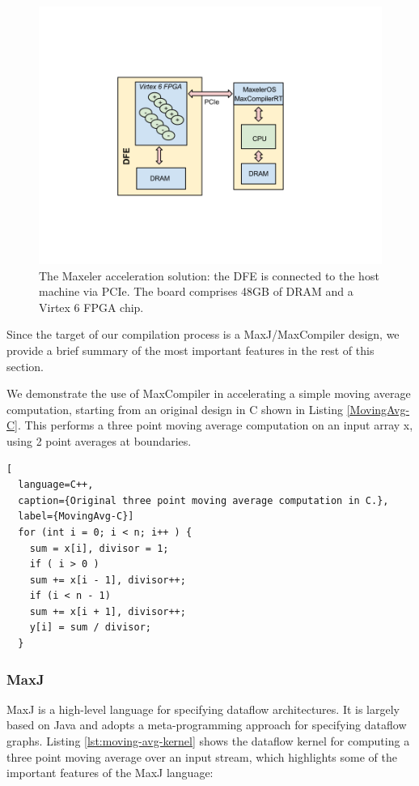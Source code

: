 \begin{figure}[h]
  \centering
  \includegraphics[scale=0.4, trim=0 200 0 200]{figs/max3.png} \caption{
    The Maxeler acceleration solution: the DFE is connected to
    the host machine via PCIe. The board comprises 48GB of DRAM and a
    Virtex 6 FPGA chip. }
  \label{fig:max3}
\end{figure}


Since the target of our compilation process is a MaxJ/MaxCompiler
design, we provide a brief summary of the most important features in
the rest of this section.

We demonstrate the use of MaxCompiler in accelerating a simple moving
average computation, starting from an original design in C shown in
Listing \ref{MovingAvg-C}. This performs a three point moving average
computation on an input array x, using 2 point averages at boundaries.

\begin{lstlisting}[
  language=C++,
  caption={Original three point moving average computation in C.},
  label={MovingAvg-C}]
  for (int i = 0; i < n; i++ ) {
    sum = x[i], divisor = 1;
    if ( i > 0 )
    sum += x[i - 1], divisor++;
    if (i < n - 1)
    sum += x[i + 1], divisor++;
    y[i] = sum / divisor;
  }
\end{lstlisting}

\subsubsection{MaxJ}

MaxJ is a high-level language for specifying dataflow
architectures. It is largely based on Java and adopts a
meta-programming approach for specifying dataflow graphs.  Listing
\ref{lst:moving-avg-kernel} shows the dataflow kernel for computing a
three point moving average over an input stream, which highlights some
of the important features of the MaxJ language:

